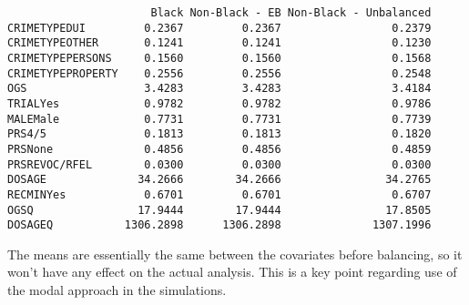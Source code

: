 \documentclass[
  letterpaper,
  DIV=11,
  numbers=noendperiod]{scrartcl}
\newenvironment{Shaded}{\begin{snugshade}}{\end{snugshade}}
\newcommand{\AttributeTok}[1]{\textcolor[rgb]{0.40,0.45,0.13}{#1}}
\newcommand{\DecValTok}[1]{\textcolor[rgb]{0.68,0.00,0.00}{#1}}
\newcommand{\FunctionTok}[1]{\textcolor[rgb]{0.28,0.35,0.67}{#1}}
\newcommand{\NormalTok}[1]{\textcolor[rgb]{0.00,0.23,0.31}{#1}}
\newcommand{\OtherTok}[1]{\textcolor[rgb]{0.00,0.23,0.31}{#1}}
\newcommand{\SpecialCharTok}[1]{\textcolor[rgb]{0.37,0.37,0.37}{#1}}
\newcommand{\StringTok}[1]{\textcolor[rgb]{0.13,0.47,0.30}{#1}}
\begin{document}
\begin{Shaded}
\end{Shaded}

\begin{verbatim}
                      Black Non-Black - EB Non-Black - Unbalanced
CRIMETYPEDUI         0.2367         0.2367                 0.2379
CRIMETYPEOTHER       0.1241         0.1241                 0.1230
CRIMETYPEPERSONS     0.1560         0.1560                 0.1568
CRIMETYPEPROPERTY    0.2556         0.2556                 0.2548
OGS                  3.4283         3.4283                 3.4184
TRIALYes             0.9782         0.9782                 0.9786
MALEMale             0.7731         0.7731                 0.7739
PRS4/5               0.1813         0.1813                 0.1820
PRSNone              0.4856         0.4856                 0.4859
PRSREVOC/RFEL        0.0300         0.0300                 0.0300
DOSAGE              34.2666        34.2666                34.2765
RECMINYes            0.6701         0.6701                 0.6707
OGSQ                17.9444        17.9444                17.8505
DOSAGEQ           1306.2898      1306.2898              1307.1996
\end{verbatim}

The means are essentially the same between the covariates before
balancing, so it won't have any effect on the actual analysis. This is a
key point regarding use of the modal approach in the simulations.
\end{document}

